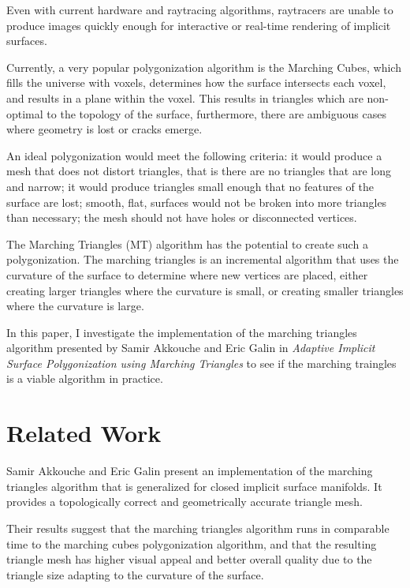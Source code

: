 \documentclass[conference]{acmsiggraph}
\begin{document}
Even with current hardware and raytracing algorithms, raytracers are unable to
produce images quickly enough for interactive or real-time rendering of
implicit surfaces.

Currently, a very popular polygonization algorithm is the Marching Cubes, which
fills the universe with voxels, determines how the surface intersects each
voxel, and results in a plane within the voxel. This results in triangles which
are non-optimal to the topology of the surface, furthermore, there are
ambiguous cases where geometry is lost or cracks emerge.

An ideal polygonization would meet the following criteria:
it would produce a mesh that does not distort triangles, that is there are no
triangles that are long and narrow; it would produce triangles small enough
that no features of the surface are lost; smooth, flat, surfaces would not be
broken into more triangles than necessary; the mesh should not have holes or
disconnected vertices.

The Marching Triangles (MT) algorithm has the potential to create such a
polygonization. The marching triangles is an incremental algorithm that uses
the curvature of the surface to determine where new vertices are placed, either
creating larger triangles where the curvature is small, or creating smaller
triangles where the curvature is large.

In this paper, I investigate the implementation of the marching triangles
algorithm presented by Samir Akkouche and Eric Galin in \textit{Adaptive
Implicit Surface Polygonization using Marching Triangles} to see if the
marching traingles is a viable algorithm in practice.


\section{Related Work}

Samir Akkouche and Eric Galin present an implementation of the marching
triangles algorithm that is generalized for closed implicit surface manifolds.
It provides a topologically correct and geometrically accurate triangle mesh.

Their results suggest that the marching triangles algorithm runs in comparable
time to the marching cubes polygonization algorithm, and that the resulting
triangle mesh has higher visual appeal and better overall quality due to the
triangle size adapting to the curvature of the surface.
\end{document}
